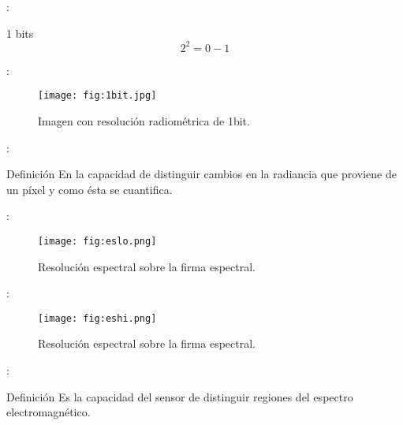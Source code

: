 
\begin{frame}{\secname : \subsecname}
  \begin{block}{1 bits}
   \begin{equation}
            2^2 = 0-1
        \end{equation}
  \end{block}
\end{frame} 


\begin{frame}{\secname : \subsecname}
  \begin{figure}
    \centering
    \texttt{[image: fig:1bit.jpg]}
    \caption{Imagen con resolución radiométrica de 1bit.}
    \label{}
  \end{figure}
\end{frame}



\begin{frame}{\secname : \subsecname}
    \begin{block}{Definición}
        En la capacidad de distinguir cambios en la radiancia que proviene de un píxel y como ésta se cuantifica.
    \end{block}
\end{frame}

\begin{frame}{\secname : \subsecname}
  \begin{figure}
    \centering
    \texttt{[image: fig:eslo.png]}
    \caption{Resolución espectral sobre la firma espectral.}
    \label{}
  \end{figure}
\end{frame}

\begin{frame}{\secname : \subsecname}
  \begin{figure}
    \centering
    \texttt{[image: fig:eshi.png]}
    \caption{Resolución espectral sobre la firma espectral.}
    \label{}
  \end{figure}
\end{frame}

\begin{frame}{\secname : \subsecname}
    \begin{block}{Definición}
        Es la capacidad del sensor de distinguir regiones del espectro electromagnético.
    \end{block}
\end{frame}


